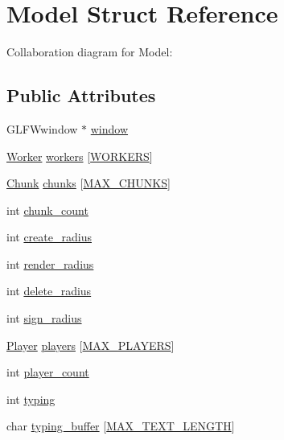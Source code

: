 \hypertarget{structModel}{}\section{Model Struct Reference}
\label{structModel}


Collaboration diagram for Model\+:
\subsection*{Public Attributes}
\begin{DoxyCompactItemize}
\item 
G\+L\+F\+Wwindow $\ast$ \hyperlink{structModel_af15f84653ef65888f996e6b78c1d6ff7}{window}
\item 
\hyperlink{structWorker}{Worker} \hyperlink{structModel_af82468267fcf9f7720dd378e0a46bad7}{workers} \mbox{[}\hyperlink{main_8c_a9e7244aa346409fc55b405b70d87f774}{W\+O\+R\+K\+E\+RS}\mbox{]}
\item 
\hyperlink{structChunk}{Chunk} \hyperlink{structModel_a454955bd2cbb283c269a5189d29b6362}{chunks} \mbox{[}\hyperlink{main_8c_a9e879c11aa15653382faa681060e6179}{M\+A\+X\+\_\+\+C\+H\+U\+N\+KS}\mbox{]}
\item 
int \hyperlink{structModel_ac890daa53d9fca686f850c61707534d3}{chunk\+\_\+count}
\item 
int \hyperlink{structModel_ab285f5b424f0989de991724b7842f7ee}{create\+\_\+radius}
\item 
int \hyperlink{structModel_a78738d6f90d8a11202fec26912dddcde}{render\+\_\+radius}
\item 
int \hyperlink{structModel_a424db0f8c4b9225fc177664d0564b9f6}{delete\+\_\+radius}
\item 
int \hyperlink{structModel_a27a1d8e175370c2b238acb4e6f68e9b7}{sign\+\_\+radius}
\item 
\hyperlink{structPlayer}{Player} \hyperlink{structModel_a35889c6e0321e390c7cc35678b561f0c}{players} \mbox{[}\hyperlink{main_8c_a1c346c944e8204fd06dc057393c7c96d}{M\+A\+X\+\_\+\+P\+L\+A\+Y\+E\+RS}\mbox{]}
\item 
int \hyperlink{structModel_aaf87a246b0eaba7090708cbf06265948}{player\+\_\+count}
\item 
int \hyperlink{structModel_a2fcef6db45ecfe5abca7e531c3edd58d}{typing}
\item 
char \hyperlink{structModel_a69f3bc4862cb7190f7d28013da4fe629}{typing\+\_\+buffer} \mbox{[}\hyperlink{main_8c_a9a90baeac9b3273d185357200b599b39}{M\+A\+X\+\_\+\+T\+E\+X\+T\+\_\+\+L\+E\+N\+G\+TH}\mbox{]}

\end{DoxyCompactItemize}
